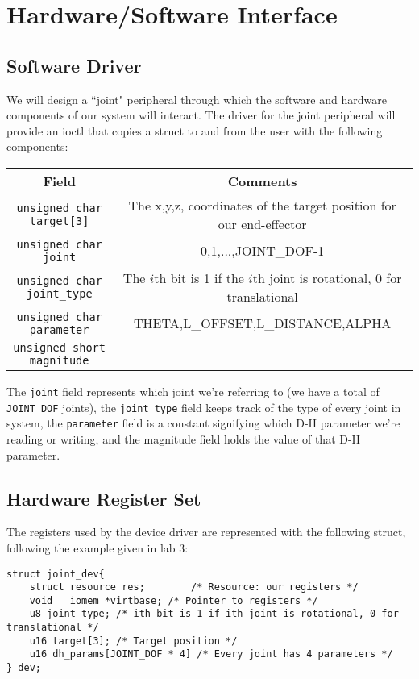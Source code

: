 \section{Hardware/Software Interface}

\subsection{Software Driver}

We will design a ``joint" peripheral through which the software and hardware components of our system will interact. 
The driver for the joint peripheral will provide an ioctl that copies a struct to and from the user with the following components:

\begin{center}
	\begin{tabular}{|c|c|}
		\hline
		Field & Comments \\
		\hline
		\texttt{unsigned char target[3]} &  The x,y,z, coordinates of the target position for our end-effector \\
			\hline
		\texttt{unsigned char joint} &  0,1,...,JOINT\_DOF-1 \\
			\hline
		\texttt{unsigned char joint\_type} & The $i$th bit is 1 if the $i$th joint is rotational, 0 for translational \\
			\hline
		\texttt{unsigned char parameter} & THETA,L\_OFFSET,L\_DISTANCE,ALPHA \\
			\hline
		\texttt{unsigned short magnitude} & ~\\
		\hline
	\end{tabular}
\end{center}
The \texttt{joint} field represents which joint we're referring to (we have a total of \texttt{JOINT\_DOF} joints), the \texttt{joint\_type}
field keeps track of the type of every joint in system, the \texttt{parameter} field
is a constant signifying which D-H parameter we're reading or writing, and the magnitude field holds the value of that D-H parameter.

\subsection{Hardware Register Set}

The registers used by the device driver are represented with the following struct, following the example given in lab 3:

\begin{verbatim}
struct joint_dev{
	struct resource res;		/* Resource: our registers */
	void __iomem *virtbase; /* Pointer to registers */
	u8 joint_type; /* ith bit is 1 if ith joint is rotational, 0 for translational */
	u16 target[3]; /* Target position */
	u16 dh_params[JOINT_DOF * 4] /* Every joint has 4 parameters */
} dev;
\end{verbatim}

